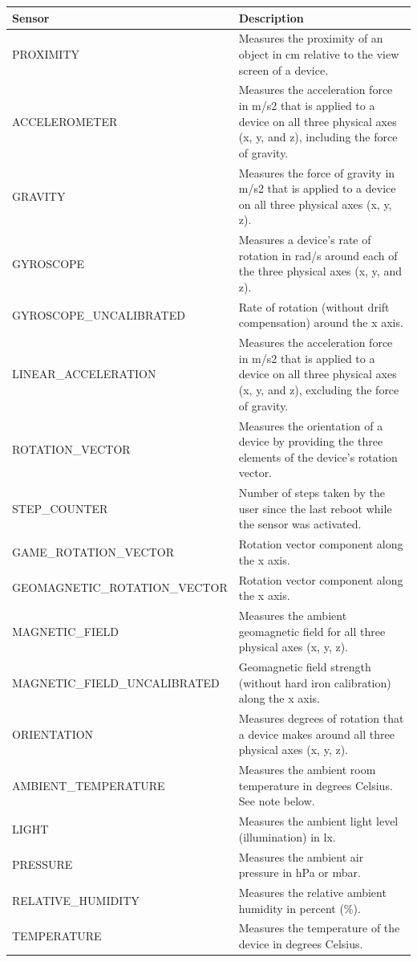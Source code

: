 \documentclass[11pt]{article} %
\begin{document}
\begin{tabulary}{\linewidth}{LL}
    \hline
    Sensor&Description\\
    \hline
	PROXIMITY                     & Measures the proximity of an object in cm relative to the view screen of a device.\\
	ACCELEROMETER                 & Measures the acceleration force in m/s2 that is applied to a device on all three physical axes (x, y, and z), including the force of gravity. \\
	GRAVITY                       & Measures the force of gravity in m/s2 that is applied to a device on all three physical axes (x, y, z).\\
	GYROSCOPE                     & Measures a device's rate of rotation in rad/s around each of the three physical axes (x, y, and z).\\
	GYROSCOPE\_UNCALIBRATED       & Rate of rotation (without drift compensation) around the x axis.\\
	LINEAR\_ACCELERATION          & Measures the acceleration force in m/s2 that is applied to a device on all three physical axes (x, y, and z), excluding the force of gravity. \\
	ROTATION\_VECTOR              & Measures the orientation of a device by providing the three elements of the device's rotation vector.\\
	STEP\_COUNTER                 & Number of steps taken by the user since the last reboot while the sensor was activated.\\
	GAME\_ROTATION\_VECTOR        & Rotation vector component along the x axis.\\
	GEOMAGNETIC\_ROTATION\_VECTOR & Rotation vector component along the x axis.\\
	MAGNETIC\_FIELD               & Measures the ambient geomagnetic field for all three physical axes (x, y, z).\\
	MAGNETIC\_FIELD\_UNCALIBRATED & Geomagnetic field strength (without hard iron calibration) along the x axis.\\
	ORIENTATION                   & Measures degrees of rotation that a device makes around all three physical axes (x, y, z).\\
	AMBIENT\_TEMPERATURE          & Measures the ambient room temperature in degrees Celsius. See note below.\\
	LIGHT                         & Measures the ambient light level (illumination) in lx.\\
	PRESSURE                      & Measures the ambient air pressure in hPa or mbar.\\
	RELATIVE\_HUMIDITY            & Measures the relative ambient humidity in percent (\%).\\
	TEMPERATURE                   & Measures the temperature of the device in degrees Celsius.  \\
    \hline
\end{tabulary} 
\end{document}
